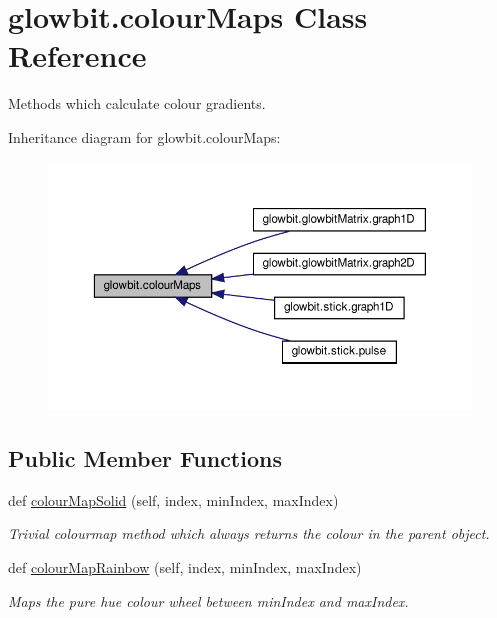 \hypertarget{classglowbit_1_1colourMaps}{}\section{glowbit.\+colour\+Maps Class Reference}
\label{classglowbit_1_1colourMaps}


Methods which calculate colour gradients.  




Inheritance diagram for glowbit.\+colour\+Maps\+:\nopagebreak
\begin{figure}[H]
\begin{center}
\leavevmode
\includegraphics[width=350pt]{classglowbit_1_1colourMaps__inherit__graph}
\end{center}
\end{figure}
\subsection*{Public Member Functions}
\begin{DoxyCompactItemize}
\item 
def \hyperlink{classglowbit_1_1colourMaps_ab54dfebabe1485e9cf2a9d47e6df24a1}{colour\+Map\+Solid} (self, index, min\+Index, max\+Index)
\begin{DoxyCompactList}\small\item\em Trivial colourmap method which always returns the colour in the parent object. \end{DoxyCompactList}\item 
def \hyperlink{classglowbit_1_1colourMaps_a41e8852322605003cf7f9f75ff508a8e}{colour\+Map\+Rainbow} (self, index, min\+Index, max\+Index)
\begin{DoxyCompactList}\small\item\em Maps the pure hue colour wheel between min\+Index and max\+Index. \end{DoxyCompactList}\end{DoxyCompactItemize}


